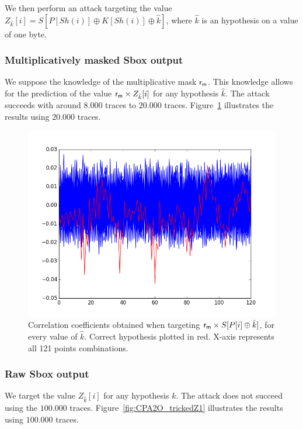 \noindent We then perform an attack targeting the value $Z_{\hat{k}}[i]=S[P[Sh(i)] \oplus K[Sh(i)] \oplus \hat{k}]$, where $\hat{k}$ is an hypothesis on a value of one byte.


\subsubsection{Multiplicatively masked Sbox output}
We suppose the knowledge of the multiplicative mask $\mathsf{r_m}$. This knowledge allows for the prediction of the value $\mathsf{r_m} \times Z_{\hat{k}}[i]$ for any hypothesis $\hat{k}$.
The attack succeeds with around $8.000$ traces to $20.000$ traces.
Figure~\ref{fig:CPA2O_trickedaZ1} illustrates the results using $20.000$ traces.

\begin{figure}[H]
	\centering 
	\includegraphics[scale=0.35]{figures/CPA2O_trickedaZ1.png}
	\caption{Correlation coefficients obtained when targeting $\mathsf{r_m} \times S[P[i]\oplus \hat{k}] $, for every value of $\hat{k}$. Correct hypothesis plotted in red. X-axis represents all 121 points combinations.}
	\label{fig:CPA2O_trickedaZ1}
\end{figure}


\subsubsection{Raw Sbox output}
We target the value $Z_{\hat{k}}[i]$ for any hypothesis $k$.
The attack does not succeed using the $100.000$ traces.
Figure~\ref{fig:CPA2O_trickedZ1} illustrates the results using $100.000$ traces.

